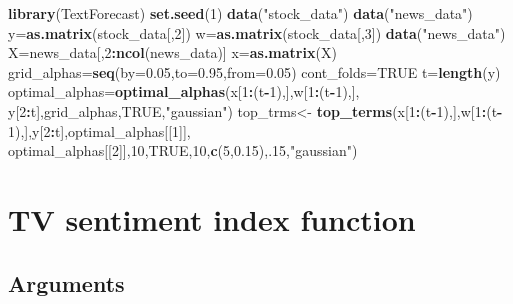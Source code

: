 \documentclass[]{article}
\newenvironment{Shaded}{\begin{snugshade}}{\end{snugshade}}
\newcommand{\KeywordTok}[1]{\textcolor[rgb]{0.13,0.29,0.53}{\textbf{#1}}}
\newcommand{\DataTypeTok}[1]{\textcolor[rgb]{0.13,0.29,0.53}{#1}}
\newcommand{\DecValTok}[1]{\textcolor[rgb]{0.00,0.00,0.81}{#1}}
\newcommand{\FloatTok}[1]{\textcolor[rgb]{0.00,0.00,0.81}{#1}}
\newcommand{\StringTok}[1]{\textcolor[rgb]{0.31,0.60,0.02}{#1}}
\newcommand{\OtherTok}[1]{\textcolor[rgb]{0.56,0.35,0.01}{#1}}
\newcommand{\OperatorTok}[1]{\textcolor[rgb]{0.81,0.36,0.00}{\textbf{#1}}}
\newcommand{\NormalTok}[1]{#1}
\begin{document}
\begin{Shaded}
\begin{Highlighting}[]
\KeywordTok{library}\NormalTok{(TextForecast)}
 \KeywordTok{set.seed}\NormalTok{(}\DecValTok{1}\NormalTok{)}
 \KeywordTok{data}\NormalTok{(}\StringTok{"stock_data"}\NormalTok{)}
 \KeywordTok{data}\NormalTok{(}\StringTok{"news_data"}\NormalTok{)}
\NormalTok{ y=}\KeywordTok{as.matrix}\NormalTok{(stock_data[,}\DecValTok{2}\NormalTok{])}
\NormalTok{ w=}\KeywordTok{as.matrix}\NormalTok{(stock_data[,}\DecValTok{3}\NormalTok{])}
 \KeywordTok{data}\NormalTok{(}\StringTok{"news_data"}\NormalTok{)}
\NormalTok{ X=news_data[,}\DecValTok{2}\OperatorTok{:}\KeywordTok{ncol}\NormalTok{(news_data)]}
\NormalTok{ x=}\KeywordTok{as.matrix}\NormalTok{(X)}
\NormalTok{ grid_alphas=}\KeywordTok{seq}\NormalTok{(}\DataTypeTok{by=}\FloatTok{0.05}\NormalTok{,}\DataTypeTok{to=}\FloatTok{0.95}\NormalTok{,}\DataTypeTok{from=}\FloatTok{0.05}\NormalTok{)}
\NormalTok{ cont_folds=}\OtherTok{TRUE}
\NormalTok{ t=}\KeywordTok{length}\NormalTok{(y)}
\NormalTok{ optimal_alphas=}\KeywordTok{optimal_alphas}\NormalTok{(x[}\DecValTok{1}\OperatorTok{:}\NormalTok{(t}\OperatorTok{-}\DecValTok{1}\NormalTok{),],w[}\DecValTok{1}\OperatorTok{:}\NormalTok{(t}\OperatorTok{-}\DecValTok{1}\NormalTok{),],}
\NormalTok{ y[}\DecValTok{2}\OperatorTok{:}\NormalTok{t],grid_alphas,}\OtherTok{TRUE}\NormalTok{,}\StringTok{"gaussian"}\NormalTok{)}
\NormalTok{ top_trms<-}\StringTok{ }\KeywordTok{top_terms}\NormalTok{(x[}\DecValTok{1}\OperatorTok{:}\NormalTok{(t}\OperatorTok{-}\DecValTok{1}\NormalTok{),],w[}\DecValTok{1}\OperatorTok{:}\NormalTok{(t}\OperatorTok{-}\DecValTok{1}\NormalTok{),],y[}\DecValTok{2}\OperatorTok{:}\NormalTok{t],optimal_alphas[[}\DecValTok{1}\NormalTok{]],}
\NormalTok{optimal_alphas[[}\DecValTok{2}\NormalTok{]],}\DecValTok{10}\NormalTok{,}\OtherTok{TRUE}\NormalTok{,}\DecValTok{10}\NormalTok{,}\KeywordTok{c}\NormalTok{(}\DecValTok{5}\NormalTok{,}\FloatTok{0.15}\NormalTok{),.}\DecValTok{15}\NormalTok{,}\StringTok{"gaussian"}\NormalTok{)}
\end{Highlighting}
\end{Shaded}

\section{TV sentiment index function}\label{tv-sentiment-index-function}

\subsection{Arguments}\label{arguments-11}
\end{document}
